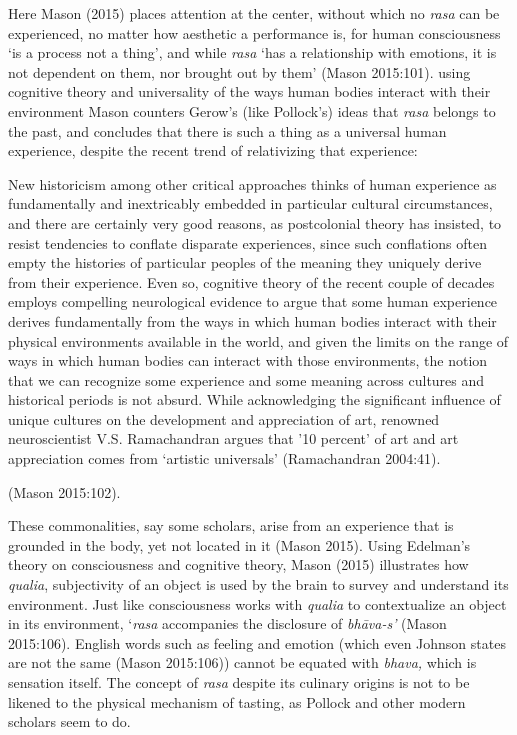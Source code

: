 Here Mason (2015) places attention at the center, without which no \textsl{rasa} can be experienced, no matter how aesthetic a performance is, for human consciousness ‘is a process not a thing’, and while \textsl{rasa} ‘has a relationship with emotions, it is not dependent on them, nor brought out by them’ (Mason 2015:101). using cognitive theory and universality of the ways human bodies interact with their environment Mason counters Gerow’s (like Pollock’s) ideas that \textsl{rasa} belongs to the past, and concludes that there is such a thing as a universal human experience, despite the recent trend of relativizing that experience:

\begin{myquote}
New historicism among other critical approaches thinks of human experience as fundamentally and inextricably embedded in particular cultural circumstances, and there are certainly very good reasons, as postcolonial theory has insisted, to resist tendencies to conflate disparate experiences, since such conflations often empty the histories of particular peoples of the meaning they uniquely derive from their experience. Even so, cognitive theory of the recent couple of decades employs compelling neurological evidence to argue that some human experience derives fundamentally from the ways in which human bodies interact with their physical environments available in the world, and given the limits on the range of ways in which human bodies can interact with those environments, the notion that we can recognize some experience and some meaning across cultures and historical periods is not absurd. While acknowledging the significant influence of unique cultures on the development and appreciation of art, renowned neuroscientist V.S. Ramachandran argues that ’10 percent’ of art and art appreciation comes from ‘artistic universals’ (Ramachandran 2004:41).  

\hfill(Mason 2015:102). 
\end{myquote}

These commonalities, say some scholars, arise from an experience that is grounded in the body, yet not located in it (Mason 2015). Using Edelman’s theory on consciousness and cognitive theory, Mason (2015) illustrates how \textsl{qualia}, subjectivity of an object is used by the brain to survey and understand its environment. Just like consciousness works with \textsl{qualia} to contextualize an object in its environment, ‘\textsl{rasa} accompanies the disclosure of \textsl{bhāva-s’} (Mason 2015:106). English words such as feeling and emotion (which even Johnson states are not the same (Mason 2015:106)) cannot be equated with \textsl{bhava,} which is sensation itself. The concept of \textsl{rasa} despite its culinary origins is not to be likened to the physical mechanism of tasting, as Pollock and other modern scholars seem to do.


